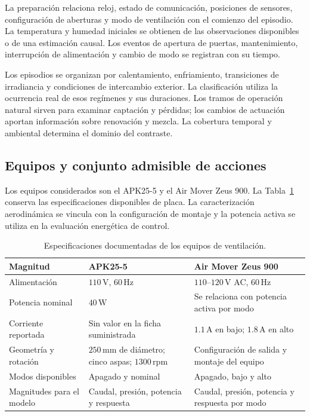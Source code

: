 La preparación relaciona reloj, estado de comunicación, posiciones de sensores, configuración de aberturas y modo de ventilación con el comienzo del episodio. La temperatura y humedad iniciales se obtienen de las observaciones disponibles o de una estimación causal. Los eventos de apertura de puertas, mantenimiento, interrupción de alimentación y cambio de modo se registran con su tiempo.

Los episodios se organizan por calentamiento, enfriamiento, transiciones de irradiancia y condiciones de intercambio exterior. La clasificación utiliza la ocurrencia real de esos regímenes y sus duraciones. Los tramos de operación natural sirven para examinar captación y pérdidas; los cambios de actuación aportan información sobre renovación y mezcla. La cobertura temporal y ambiental determina el dominio del contraste.

\subsection{Equipos y conjunto admisible de acciones}
\label{met:actuadores}

Los equipos considerados son el APK25-5 y el Air Mover Zeus 900. La Tabla~\ref{met:tabla_actuadores} conserva las especificaciones disponibles de placa. La caracterización aerodinámica se vincula con la configuración de montaje y la potencia activa se utiliza en la evaluación energética de control.

\begin{table}[htbp]
\centering
\small
\caption{Especificaciones documentadas de los equipos de ventilación.}
\label{met:tabla_actuadores}
\begingroup
\renewcommand{\arraystretch}{1.28}
\begin{tabularx}{\textwidth}{>{\raggedright\arraybackslash}p{}>{\raggedright\arraybackslash}p{}>{\raggedright\arraybackslash}X}
\toprule
Magnitud & APK25-5 & Air Mover Zeus 900 \\
\midrule
Alimentación & $110\,\mathrm V$, $60\,\mathrm{Hz}$ & $110$--$120\,\mathrm V$ AC, $60\,\mathrm{Hz}$ \\
Potencia nominal & $40\,\mathrm W$ & Se relaciona con potencia activa por modo \\
Corriente reportada & Sin valor en la ficha suministrada & $1.1\,\mathrm A$ en bajo; $1.8\,\mathrm A$ en alto \\
Geometría y rotación & $250\,\mathrm{mm}$ de diámetro; cinco aspas; $1300\,\mathrm{rpm}$ & Configuración de salida y montaje del equipo \\
Modos disponibles & Apagado y nominal & Apagado, bajo y alto \\
Magnitudes para el modelo & Caudal, presión, potencia y respuesta & Caudal, presión, potencia y respuesta por modo \\
\bottomrule
\end{tabularx}
\endgroup
\end{table}


